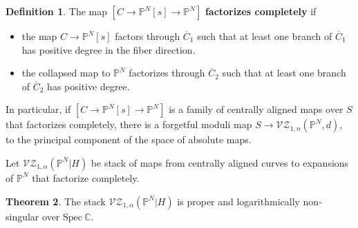 \documentclass[11pt]{amsart}
\renewcommand{\to}{\rightarrow}
\theoremstyle{definition}
\newtheorem{thm}{Theorem}[section]
\theoremstyle{definition}
\newtheorem{definition}[thm]{Definition}
\begin{document}
\begin{definition}
The map $[C\to \mathbb P^N[s]\to \mathbb P^N]$ \textbf{factorizes completely} if
\begin{itemize}
\item the map $C\to \mathbb P^N[s]$ factors through $\overline C_1$ such that at least one branch of $\overline C_1$ has positive degree in the fiber direction. 
\item the collapsed map to $\mathbb P^N$ factorizes through $\overline C_2$ such that at least one branch of $\overline C_2$ has positive degree.
\end{itemize}
\end{definition}

In particular, if $[C\to \mathbb P^N[s]\to \mathbb P^N]$ is a family of centrally aligned maps over $S$ that factorizes completely, there is a forgetful moduli map $S\to \mathcal{VZ}_{1,n}(\mathbb P^N,d)$, to the principal component of the space of absolute maps.

Let $\mathcal{VZ}_{1,\alpha}(\mathbb P^N|H)$ be stack of maps from centrally aligned curves to expansions of $\mathbb P^N$ that factorize completely.

\begin{thm}\label{thm: log-smoothness}
The stack $\mathcal{VZ}_{1,\alpha}(\mathbb P^N|H)$ is proper and logarithmically non-singular over $\mathrm{Spec} \ \mathbb C$. 
\end{thm}
\end{document}

